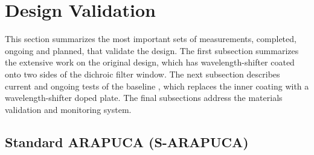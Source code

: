 \section{Design Validation}
\label{sec:fdsp-pd-validation}

This section summarizes the most important sets of measurements, completed, ongoing and planned, that validate the  design. The first subsection summarizes the extensive work on the original  design, which has wavelength-shifter coated onto two sides of the dichroic filter window. The next subsection describes current and ongoing tests of the baseline , which replaces the inner coating with a wavelength-shifter doped plate. The final subsections address the materials validation and monitoring system.


\subsection{Standard ARAPUCA (S-ARAPUCA)}
\label{sec:sarapuca-prototypes}

